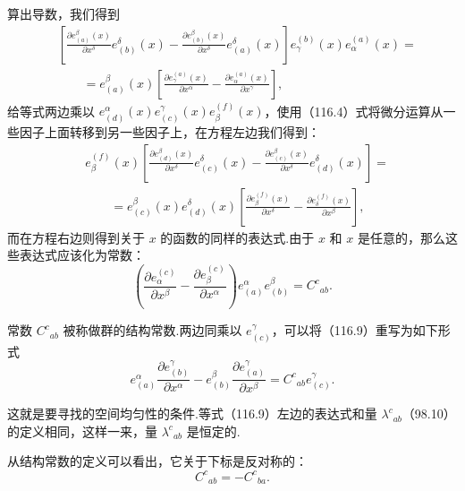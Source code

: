 算出导数，我们得到
\begin{equation*}
  \begin{aligned}
    &\left[\frac{\partial e_{(a)}^{\beta}(x)}{\partial x^{\delta}}
    e_{(b)}^{\delta}(x)
    -\frac{\partial e_{(b)}^{\beta}(x)}{\partial x^{\delta}}
    e_{(a)}^{\delta}(x)\right]
    e_{\gamma}^{(b)}(x)e_{\alpha}^{(a)}(x)=\\
    &\qquad=e_{(a)}^{\beta}(x)
    \left[\frac{\partial e_{\gamma}^{(a)}(x)}{\partial x^{\alpha}}
    -\frac{\partial e_{\alpha}^{(a)}(x)}{\partial x^{\gamma}}\right],
  \end{aligned}
\end{equation*}
给等式两边乘以 $e_{(d)}^{\alpha}(x)e_{(c)}^{\gamma}(x)e_{\beta}^{(f)}(x)$，使用（116.4）式将微分运算从一些因子上面转移到另一些因子上，在方程左边我们得到：
\begin{equation*}
  \begin{aligned}
    &e_{\beta}^{(f)}(x)
    \left[\frac{\partial e_{(d)}^{\beta}(x)}{\partial x^{\delta}}
    e_{(c)}^{\delta}(x)
    -\frac{\partial e_{(c)}^{\beta}(x)}{\partial x^{\delta}}
    e_{(d)}^{\delta}(x)\right]=\\
    &\qquad=e_{(c)}^{\beta}(x)e_{(d)}^{\delta}(x)
    \left[\frac{\partial e_{\beta}^{(f)}(x)}{\partial x^{\delta}}
    -\frac{\partial e_{\delta}^{(f)}(x)}{\partial x^{\beta}}\right],
  \end{aligned}
\end{equation*}
而在方程右边则得到关于 $x$ 的函数的同样的表达式.由于 $x$ 和 $x$ 是任意的，那么这些表达式应该化为常数：
\begin{equation}
  \left(\frac{\partial e_{\alpha}^{(c)}}{\partial x^{\beta}}
  -\frac{\partial e_{\beta}^{(c)}}{\partial x^{\alpha}}\right)
  e_{(a)}^{\alpha}e_{(b)}^{\beta}=C^{c}{}_{ab}.
\end{equation}

常数 $C^{c}{}_{ab}$ 被称做群的结构常数.两边同乘以 $e_{(c)}^{\gamma}$，可以将（116.9）重写为如下形式
\begin{equation}
  e_{(a)}^{\alpha}\frac{\partial e_{(b)}^{\gamma}}{\partial x^{\alpha}}
  -e_{(b)}^{\beta}\frac{\partial e_{(a)}^{\gamma}}{\partial x^{\beta}}
  =C^{c}{}_{ab}e_{(c)}^{\gamma}.
\end{equation}

这就是要寻找的空间均匀性的条件.等式（116.9）左边的表达式和量 $\lambda^{c}{}_{ab}$（98.10）的定义相同，这样一来，量 $\lambda^{c}{}_{ab}$ 是恒定的.

从结构常数的定义可以看出，它关于下标是反对称的：
\begin{equation}
  C^{c}{}_{ab}=-C^{c}{}_{ba}.
\end{equation}


